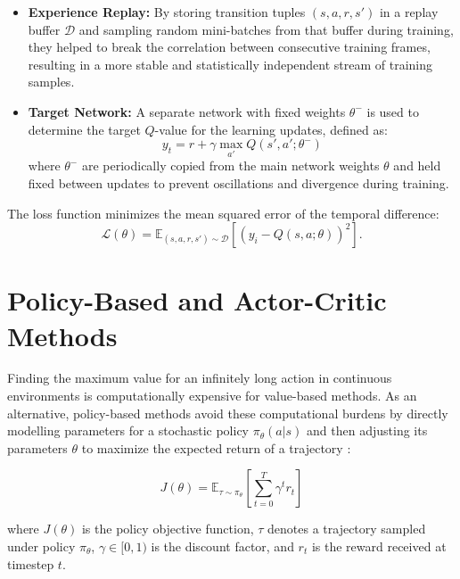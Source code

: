 \begin{itemize}
    \item \textbf{Experience Replay:} By storing transition tuples $(s, a, r, s')$ in a replay buffer $\mathcal{D}$ and sampling random mini-batches from that buffer during training, they helped to break the correlation between consecutive training frames, resulting in a more stable and statistically independent stream of training samples.

    \item \textbf{Target Network:} A separate network with fixed weights $\theta^{-}$ is used to determine the target $Q$-value for the learning updates, defined as:
    \begin{equation}
        y_t = r + \gamma \max_{a'} Q(s', a'; \theta^{-})
    \end{equation}
    where $\theta^{-}$ are periodically copied from the main network weights $\theta$ and held fixed between updates to prevent oscillations and divergence during training.
\end{itemize}
The loss function minimizes the mean squared error of the temporal difference:
\begin{equation}
    \mathcal{L}(\theta) = \mathbb{E}_{(s,a,r,s') \sim \mathcal{D}} \left[ \left( y_i - Q(s,a;\theta) \right)^2 \right].
    \label{eq:dqn_loss}
\end{equation}

\section{Policy-Based and Actor-Critic Methods}
\label{sec:lit_policy_based}

Finding the maximum value for an infinitely long action in continuous environments is computationally expensive for value-based methods. As an alternative, policy-based methods avoid these computational burdens by directly modelling parameters for a stochastic policy $\pi_\theta(a|s)$ and then adjusting its parameters $\theta$ to maximize the expected return of a trajectory \citep{sutton1999policy}:

\begin{equation}
    J(\theta) = \mathbb{E}_{\tau \sim \pi_\theta} \left[ \sum_{t=0}^{T} \gamma^t r_t \right]
\end{equation}

where $J(\theta)$ is the policy objective function, $\tau$ denotes a trajectory sampled under policy $\pi_\theta$, $\gamma \in [0,1)$ is the discount factor, and $r_t$ is the reward received at timestep $t$.

